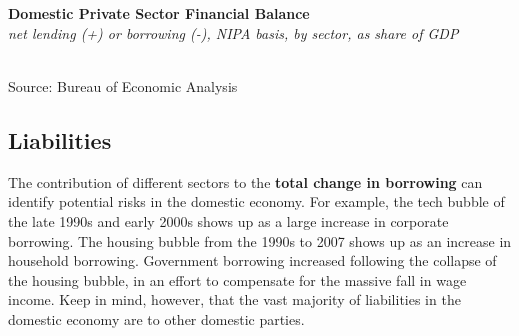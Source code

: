 \documentclass{report}
\makeatletter
\newcommand{\tbllink}[1]{\href{https://raw.githubusercontent.com/bdecon/US-chartbook/master/chartbook/data/#1}{\faTable}}
\newcommand*\short[1]{\expandafter\@gobbletwo\number\numexpr#1\relax}
\newcommand{\sbar}[4]{
		\addplot[ybar stacked, bar width=2.6pt, draw opacity=0, fill=#1] 
			table [x=#2, y=#3, col sep=comma]{#4};}
\newcommand{\dateaxisticks}{
		date coordinates in=x, axis line style={draw=none},
		xmax={2020-05-10},
		max space between ticks=40,	    
		xtick={{1990-01-01}, {1992-01-01}, {1994-01-01}, 
			{1996-01-01}, {1998-01-01}, {2000-01-01}, 
			{2002-01-01}, {2004-01-01}, {2006-01-01},
			{2008-01-01}, {2010-01-01}, {2012-01-01}, {2014-01-01},
		    {2016-01-01}, {2018-01-01}, {2020-01-01}},
		minor xtick={{1989-01-01}, {1991-01-01}, {1993-01-01},
			{1995-01-01}, {1997-01-01}, {1999-01-01}, 
			{2001-01-01}, {2003-01-01}, {2005-01-01}, {2007-01-01},
		    {2009-01-01}, {2011-01-01}, {2013-01-01}, {2015-01-01},
		    {2017-01-01}, {2019-01-01}},
		enlarge y limits={0.06}, enlarge x limits={0.01},
		}
\newcommand{\bbar}[2]{extra #1 ticks = {{#2}}, extra #1 tick labels = ,
		extra #1 tick style = {grid=major, grid style={thick, black!25}},}
\newcommand{\rbars}{
		\fill[color=black!10] (axis cs:{1990-07-01},\pgfkeysvalueof{/pgfplots/ymin}) rectangle 
			(axis cs:{1991-03-01}, \pgfkeysvalueof{/pgfplots/ymax});
		\fill[color=black!10] (axis cs:{2007-12-01},\pgfkeysvalueof{/pgfplots/ymin}) rectangle 
			(axis cs:{2009-07-01}, \pgfkeysvalueof{/pgfplots/ymax});
		\fill[color=black!10] (axis cs:{2001-03-01},\pgfkeysvalueof{/pgfplots/ymin}) rectangle 
			(axis cs:{2001-11-01}, \pgfkeysvalueof{/pgfplots/ymax});}
\makeatother
\begin{document}
{{\begin{minipage}{0.76\textwidth}
\vspace{2mm}

\small  \\

\\

\vspace{2mm}

\noindent \normalsize \textbf{Domestic Private Sector Financial Balance}\\
\footnotesize{\textit{net lending (+) or borrowing (-), NIPA basis, by sector, as share of GDP}}\\
\noindent \hspace*{-3mm} \\
\footnotesize{Source: Bureau of Economic Analysis} \hfill \tbllink{sectbal2.csv}

\end{minipage}

\newpage

\begin{minipage}{0.76\textwidth}

\subsection*{\color{black!70} \seriffont Liabilities}

\small The contribution of different sectors to the \textbf{total change in borrowing} can identify potential risks in the domestic economy. For example, the tech bubble of the late 1990s and early 2000s shows up as a large increase in corporate borrowing. The housing bubble from the 1990s to 2007 shows up as an increase in household borrowing. Government borrowing increased following the collapse of the housing bubble, in an effort to compensate for the massive fall in wage income. Keep in mind, however, that the vast majority of liabilities in the domestic economy are to other domestic parties.\\


\end{minipage}}}
\end{document}
